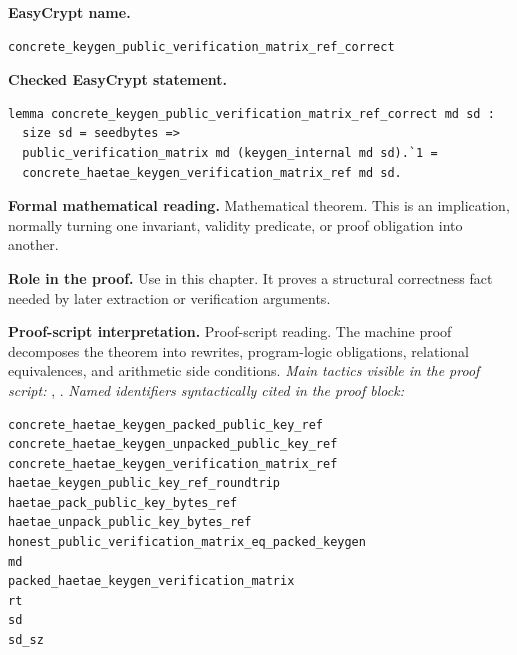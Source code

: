 \begin{formaltheorem}
\noindent\textbf{EasyCrypt name.}
\begin{lstlisting}[language=EasyCrypt,basicstyle=\ttfamily\scriptsize]
concrete_keygen_public_verification_matrix_ref_correct
\end{lstlisting}
\noindent\textbf{Checked EasyCrypt statement.}
\begin{lstlisting}[language=EasyCrypt,basicstyle=\ttfamily\scriptsize]
lemma concrete_keygen_public_verification_matrix_ref_correct md sd :
  size sd = seedbytes =>
  public_verification_matrix md (keygen_internal md sd).`1 =
  concrete_haetae_keygen_verification_matrix_ref md sd.
\end{lstlisting}
\noindent\textbf{Formal mathematical reading.}
Mathematical theorem. This is an implication, normally turning one invariant, validity predicate, or proof obligation into another.

\noindent\textbf{Role in the proof.}
Use in this chapter. It proves a structural correctness fact needed by later extraction or verification arguments.

\noindent\textbf{Proof-script interpretation.}
Proof-script reading. The machine proof decomposes the theorem into rewrites, program-logic obligations, relational equivalences, and arithmetic side conditions.
\emph{Main tactics visible in the proof script:} , .
\emph{Named identifiers syntactically cited in the proof block:}
\begin{lstlisting}[language=EasyCrypt,basicstyle=\ttfamily\scriptsize]
concrete_haetae_keygen_packed_public_key_ref
concrete_haetae_keygen_unpacked_public_key_ref
concrete_haetae_keygen_verification_matrix_ref
haetae_keygen_public_key_ref_roundtrip
haetae_pack_public_key_bytes_ref
haetae_unpack_public_key_bytes_ref
honest_public_verification_matrix_eq_packed_keygen
md
packed_haetae_keygen_verification_matrix
rt
sd
sd_sz
\end{lstlisting}

\end{formaltheorem}

